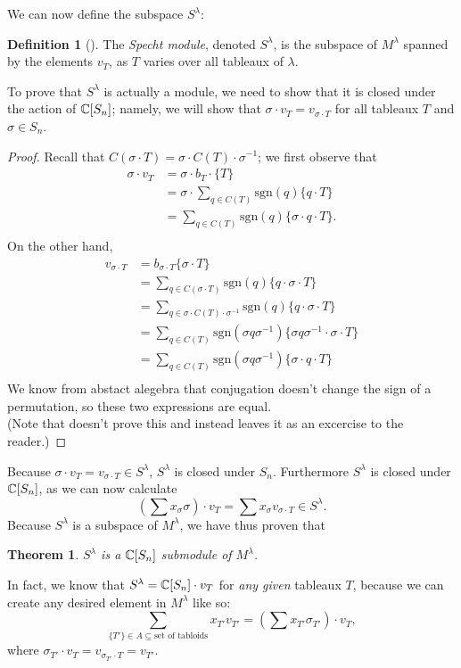 \documentclass[11 pt]{amsart}
\theoremstyle{plain}   %
\newtheorem{thm}{Theorem}[section] %
\theoremstyle{definition}
\newtheorem{defn}{Definition}[section]
\theoremstyle{remark}
\numberwithin{equation}{section}
\def\sgn{\mathrm{sgn}}
\begin{document}
We can now define the subspace $S^\lambda$:
\begin{defn}[{\cite[Pg. 87]{fulton}}]
  The \emph{Specht module}, denoted \emph{$S^\lambda$}, is the subspace of $M^\lambda$ spanned by the elements $v_T$, as $T$ varies over all tableaux of
  $\lambda$.
\end{defn}
To prove that $S^\lambda$ is actually a module, we need to show that it is closed under the action of $\mathbb{C}[S_n]$; namely,
we will show that $\sigma \cdot v_T = v_{\sigma \cdot T}$ for all tableaux $T$ and $\sigma \in S_n$.
\begin{proof}
  Recall that $C(\sigma \cdot T) = \sigma \cdot C(T) \cdot \sigma^{-1}$; we first observe that
    \begin{align*}
    \sigma \cdot v_{T} &= \sigma \cdot b_T \cdot \{ T\} \\
                       &= \sigma \cdot \sum_{ q \in C(T)} \sgn(q) \{q \cdot T\} \\
                       &= \sum_{ q \in C(T)} \sgn(q) \{\sigma \cdot q \cdot T\}. \\
  \end{align*}
  On the other hand,
    \begin{align*}
    v_{\sigma \cdot T} &= b_{\sigma \cdot T} \{ \sigma \cdot T\} \\
                       &= \sum_{q \in C(\sigma \cdot T)} \sgn(q) \{q \cdot \sigma \cdot T\}\\
                       &= \sum_{q \in \sigma \cdot C(T) \cdot \sigma^{-1}} \sgn(q) \{q \cdot \sigma \cdot T\}\\
                       &= \sum_{q \in C(T)} \sgn(\sigma q \sigma^{-1}) \{\sigma q \sigma^{-1} \cdot \sigma \cdot T\}\\
                       &= \sum_{q \in C(T)} \sgn(\sigma q \sigma^{-1}) \{\sigma \cdot q \cdot T\}\\      
  \end{align*}
  We know from abstact alegebra that conjugation doesn't change the sign of a permutation, so these two expressions are equal.\\
  (Note that \cite{fulton} doesn't prove this and instead leaves it as an excercise to the reader.)
\end{proof}

Because $\sigma \cdot v_T = v_{\sigma \cdot T} \in S^\lambda$, $S^\lambda$ is closed under $S_n$. Furthermore $S^\lambda$ is closed under $\mathbb{C} [S_n]$, as we can
now calculate
\[(\sum x_\sigma \sigma) \cdot v_T = \sum x_\sigma v_{\sigma \cdot T} \in S^\lambda.\]
Because $S^\lambda$ is a subspace of $M^\lambda$, we have thus proven that
\begin{thm}
  $S^\lambda$ is a $\mathbb{C}[S_n]$ submodule of $M^\lambda$.
\end{thm}
In fact, we know that $S^\lambda = \mathbb{C}[S_n] \cdot v_T$ for \emph{any given} tableaux $T$,
because we can create any desired element in $M^\lambda$ like so:
\[\sum_{\{T'\} \in A \subseteq \text{set of tabloids}} x_{T'} v_{T'} = (\sum x_{T'} \sigma_{T'}) \cdot v_T,\]
where $\sigma_{T'} \cdot v_T = v_{\sigma_{T'} \cdot T} = v_{T'}$.
\end{document}
